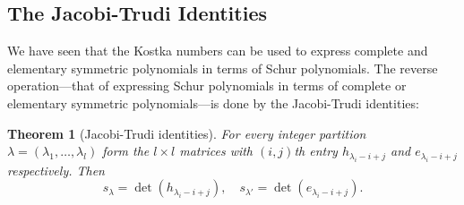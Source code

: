 \documentclass[11pt]{amsproc}
\newtheorem{theorem}{Theorem}[subsection]
\theoremstyle{definition}
\theoremstyle{example}
\begin{document}
\subsection{The Jacobi-Trudi Identities}
\label{sec:jacobi-trudi-ident}
We have seen that the Kostka numbers can be used to express complete and elementary symmetric polynomials in terms of Schur polynomials.
The reverse operation---that of expressing Schur polynomials in terms of complete or elementary symmetric polynomials---is done by the Jacobi-Trudi identities:
\begin{theorem}
  [Jacobi-Trudi identities]
  For every integer partition $\lambda=(\lambda_1,\dotsc,\lambda_l)$ form the $l\times l$ matrices with $(i,j)$th entry $h_{\lambda_i-i+j}$ and $e_{\lambda_i-i+j}$ respectively.
  Then
  \begin{displaymath}
    s_\lambda = \det(h_{\lambda_i-i+j}), \quad s_{\lambda'} = \det(e_{\lambda_i-i+j}).
  \end{displaymath}
\end{theorem}
\end{document}
